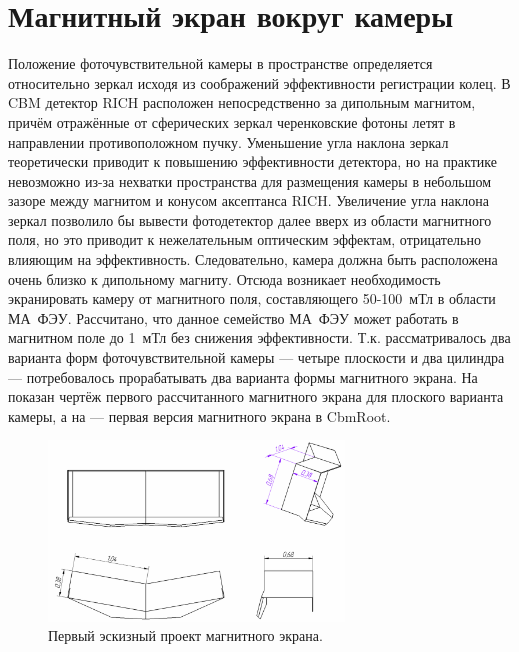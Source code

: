 \section{Магнитный экран вокруг камеры}


Положение фоточувствительной камеры в пространстве определяется относительно зеркал исходя из соображений эффективности регистрации колец. В CBM детектор RICH расположен непосредственно за дипольным магнитом, причём отражённые от сферических зеркал черенковские фотоны летят в направлении противоположном пучку. Уменьшение угла наклона зеркал теоретически приводит к повышению эффективности детектора, но на практике невозможно из-за нехватки пространства для размещения камеры в небольшом зазоре между магнитом и конусом аксептанса RICH. Увеличение угла наклона зеркал позволило бы вывести фотодетектор далее вверх из области магнитного поля, но это приводит к нежелательным оптическим эффектам, отрицательно влияющим на эффективность. Следовательно, камера должна быть расположена очень близко к дипольному магниту. Отсюда возникает необходимость экранировать камеру от магнитного поля, составляющего 50-100~мТл в области МА~ФЭУ. Рассчитано, что данное семейство МА~ФЭУ может работать в магнитном поле до 1~мТл без снижения эффективности. Т.к. рассматривалось два варианта форм фоточувствительной камеры --- четыре плоскости и два цилиндра --- потребовалось прорабатывать два варианта формы магнитного экрана. На  показан чертёж первого рассчитанного магнитного экрана для плоского варианта камеры, а на  --- первая версия магнитного экрана в CbmRoot.

\begin{figure}[H]
\centering
\includegraphics[width=0.7\textwidth]{pictures/First_shielding_box_1.png}
\caption{Первый эскизный проект магнитного экрана.}
\label{fig:ShieldingBox}
\end{figure}

